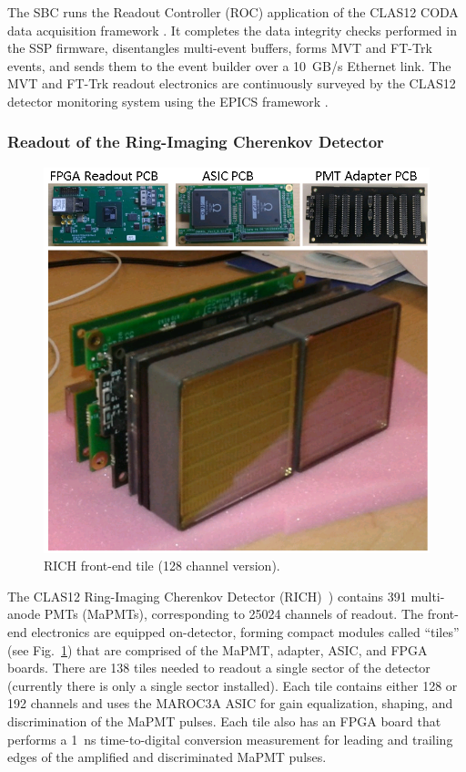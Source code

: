 The SBC runs the Readout Controller (ROC) application of the CLAS12 CODA data acquisition framework \cite{coda-ref}.
It completes the data integrity checks performed in the SSP firmware, disentangles multi-event buffers, forms MVT
and FT-Trk events, and sends them to the event builder over a 10~GB/s Ethernet link. The MVT and FT-Trk readout
electronics are continuously surveyed by the CLAS12 detector monitoring system using the EPICS framework
\cite{epics-website}.

\subsubsection{Readout of the Ring-Imaging Cherenkov Detector}

\begin{figure}[hbt]
	\centering
	\includegraphics[width=1.0\columnwidth,keepaspectratio]{img/rich_tile_128ch.png}
	\caption{RICH front-end tile (128 channel version).}
	\label{fig:rich1}
\end{figure}

The CLAS12 Ring-Imaging Cherenkov Detector (RICH)~\cite{rich-ref}) contains 391 multi-anode PMTs (MaPMTs),
corresponding to 25024 channels of readout. The front-end electronics are equipped on-detector, forming compact
modules called ``tiles'' (see Fig.~\ref{fig:rich1}) that are comprised of the MaPMT, adapter, ASIC, and FPGA boards.
There are 138 tiles needed to readout a single sector of the detector (currently there is only a single sector installed).
Each tile contains either 128 or 192 channels and uses the MAROC3A ASIC for gain equalization, shaping, and
discrimination of the MaPMT pulses. Each tile also has an FPGA board that performs a 1~ns time-to-digital conversion
measurement for leading and trailing edges of the amplified and discriminated MaPMT pulses.


